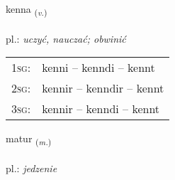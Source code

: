 \documentclass[frontgrid, backgrid]{flacards}\usepackage[]{graphicx}\usepackage[]{xcolor}
\begin{document}
\renewcommand{\flhead}{\vskip5pt \fboxsep=0pt {\small\bfseries\footnotesize Sagnorð | czasownik}}
\renewcommand{\fcfoot}{\vskip5pt \fboxsep=0pt \hspace{2pt}{\small\bfseries\footnotesize 1K}}

\renewcommand{\blhead}{\vskip5pt {\small\bfseries\footnotesize Sagnorð | czasownik }}
\renewcommand{\bcfoot}{\vskip5pt \hspace{2pt}{\small\bfseries\footnotesize 1K}}


{kenna \small{\textsubscript{(\textit{v.})}} \\[1ex] %
\textphonetic{[cʰɛna]} \\
pl.: \emph{uczyć, nauczać; obwinić} \\  [2ex]
\renewcommand*{\arraystretch}{0.8}
\begin{tabular}{p{1cm}l}
\textsc{1sg}: & kenni -- kenndi -- kennt \\ 
\textsc{2sg}: & kennir -- kenndir -- kennt \\ 
\textsc{3sg}: & kennir -- kenndi -- kennt \\ 
\end{tabular}
}

\renewcommand{\flhead}{\vskip5pt \fboxsep=0pt {\small\bfseries\footnotesize Nafnorð | rzeczownik}}
\renewcommand{\fcfoot}{\vskip5pt \fboxsep=0pt \hspace{2pt}{\small\bfseries\footnotesize 1K}}

\renewcommand{\blhead}{\vskip5pt {\small\bfseries\footnotesize Nafnorð | rzeczownik }}
\renewcommand{\bcfoot}{\vskip5pt \hspace{2pt}{\small\bfseries\footnotesize 1K}}


{matur \small{\textsubscript{(\textit{m.})}} \\[1ex] %
\textphonetic{[maːtʏr]} \\
pl.: \emph{jedzenie} \\  [2ex]
\renewcommand*{\arraystretch}{0.8}
}
\end{document}
